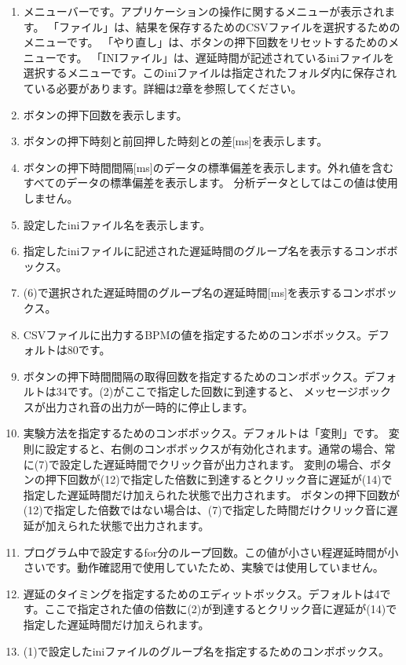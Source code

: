 \documentclass{article} %
\begin{document}
\begin{enumerate}[label=(\arabic*), leftmargin=*]
  \item メニューバーです。アプリケーションの操作に関するメニューが表示されます。
  「ファイル」は、結果を保存するためのCSVファイルを選択するためのメニューです。
  「やり直し」は、ボタンの押下回数をリセットするためのメニューです。
  「INIファイル」は、遅延時間が記述されているiniファイルを選択するメニューです。このiniファイルは指定されたフォルダ内に保存されている必要があります。詳細は2章を参照してください。
  \item ボタンの押下回数を表示します。
  \item ボタンの押下時刻と前回押した時刻との差[ms]を表示します。 
  \item ボタンの押下時間間隔[ms]のデータの標準偏差を表示します。外れ値を含むすべてのデータの標準偏差を表示します。
  分析データとしてはこの値は使用しません。
  \item 設定したiniファイル名を表示します。
  \item 指定したiniファイルに記述された遅延時間のグループ名を表示するコンボボックス。
  \item (6)で選択された遅延時間のグループ名の遅延時間[ms]を表示するコンボボックス。
  \item CSVファイルに出力するBPMの値を指定するためのコンボボックス。デフォルトは80です。
  \item ボタンの押下時間間隔の取得回数を指定するためのコンボボックス。デフォルトは34です。(2)がここで指定した回数に到達すると、
  メッセージボックスが出力され音の出力が一時的に停止します。
  \item 実験方法を指定するためのコンボボックス。デフォルトは「変則」です。
  変則に設定すると、右側のコンボボックスが有効化されます。通常の場合、常に(7)で設定した遅延時間でクリック音が出力されます。
  変則の場合、ボタンの押下回数が(12)で指定した倍数に到達するとクリック音に遅延が(14)で指定した遅延時間だけ加えられた状態で出力されます。
  ボタンの押下回数が(12)で指定した倍数ではない場合は、(7)で指定した時間だけクリック音に遅延が加えられた状態で出力されます。
  \item プログラム中で設定するfor分のループ回数。この値が小さい程遅延時間が小さいです。動作確認用で使用していたため、実験では使用していません。
  \item 遅延のタイミングを指定するためのエディットボックス。デフォルトは4です。ここで指定された値の倍数に(2)が到達するとクリック音に遅延が(14)で指定した遅延時間だけ加えられます。
  \item (1)で設定したiniファイルのグループ名を指定するためのコンボボックス。

\end{enumerate}
\end{document}
